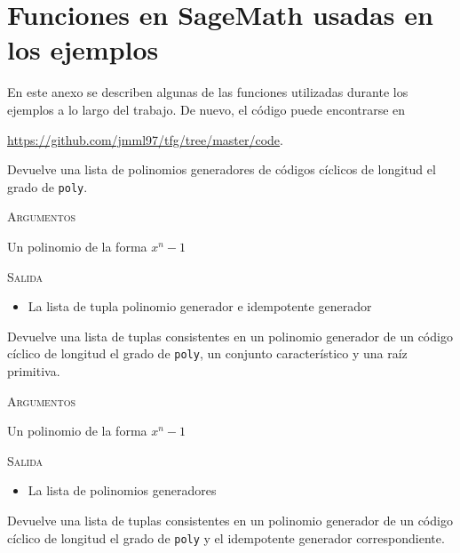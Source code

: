 \chapter{Funciones en SageMath usadas en los ejemplos}
\label{annex:sage-gen-idemp}

En este anexo se describen algunas de las funciones utilizadas durante los ejemplos a lo largo del trabajo.
De nuevo, el código puede encontrarse en
\begin{center}
  \url{https://github.com/jmml97/tfg/tree/master/code}.
\end{center}

\begin{description}[font=\ttfamily, style=nextline]
  \item[generators(poly)] Devuelve una lista de polinomios generadores de códigos cíclicos de longitud el grado de \texttt{poly}.
  
  \textsc{Argumentos}
  \begin{description}[font=\normalfont\ttfamily]
    \item[poly] Un polinomio de la forma \(x^n - 1\)
  \end{description}
  
  \textsc{Salida}
  \begin{itemize}
    \item La lista de tupla polinomio generador e idempotente generador
  \end{itemize}

  \item[defining\_sets(poly)] Devuelve una lista de tuplas consistentes en un polinomio generador de un código cíclico de longitud el grado de \texttt{poly}, un conjunto característico y una raíz primitiva.
  
  \textsc{Argumentos}
  \begin{description}[font=\normalfont\ttfamily]
    \item[poly] Un polinomio de la forma \(x^n - 1\)
  \end{description}

  \textsc{Salida}
  \begin{itemize}
    \item La lista de polinomios generadores
  \end{itemize}

  \item[generator\_and\_idempotents(poly)] Devuelve una lista de tuplas consistentes en un polinomio generador de un código cíclico de longitud el grado de \texttt{poly} y el idempotente generador correspondiente.
  

\end{description}

